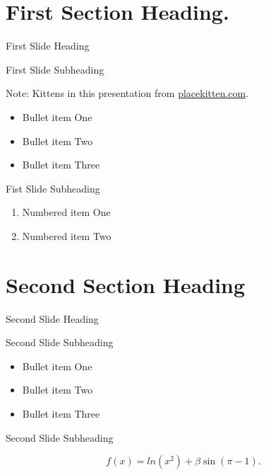 \section{First Section Heading.}\label{first-section-heading.}

\begin{frame}{First Slide Heading}

\begin{block}{First Slide Subheading}

Note: Kittens in this presentation from
\href{http://placekitten.com/attribution.html}{placekitten.com}.

\begin{itemize}
\itemsep1pt\parskip0pt
\item
  Bullet item One
\item
  Bullet item Two
\item
  Bullet item Three
\end{itemize}

\end{block}

\begin{block}{Fist Slide Subheading}

\begin{enumerate}
\def\labelenumi{\arabic{enumi}.}
\itemsep1pt\parskip0pt
\item
  Numbered item One
\item
  Numbered item Two
\end{enumerate}

\end{block}

\end{frame}

\section{Second Section Heading}\label{second-section-heading}

\begin{frame}{Second Slide Heading}

\begin{block}{Second Slide Subheading}

\begin{itemize}
\itemsep1pt\parskip0pt
\item
  Bullet item One
\item
  Bullet item Two
\item
  Bullet item Three
\end{itemize}

\end{block}

\begin{block}{Second Slide Subheading}

\[ 
f(x) = ln(x^2) + \beta \sin( \pi - 1).
\]

\end{block}

\end{frame}

